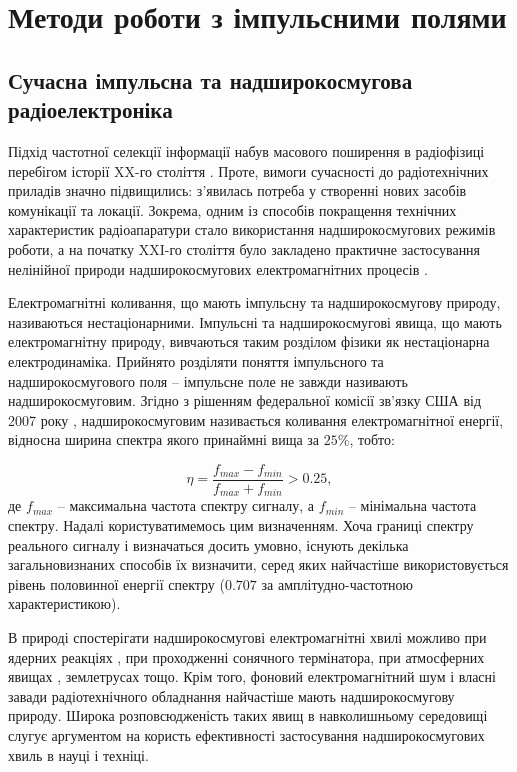 \chapter{Методи роботи з імпульсними полями}
\label{ch:review}

\section{Сучасна імпульсна та надширокосмугова радіоелектроніка}

Підхід частотної селекції інформації набув масового поширення в радіофізиці
перебігом історії XX-го століття \cite{imp:Nosich2001}. Проте, вимоги 
сучасності до радіотехнічних приладів значно підвищились: з'явилась потреба 
у створенні нових засобів комунікації та локації. Зокрема, одним із 
способів покращення технічних характеристик радіоапаратури стало 
використання надширокосмугових режимів роботи, а на початку XXI-го 
століття було закладено практичне застосування нелінійної природи 
надширокосмугових електромагнітних процесів \cite{imp:Chernogor2008}.

Електромагнітні коливання, що мають імпульсну та надширокосмугову природу, 
називаються нестаціонарними. Імпульсні та надширокосмугові явища, 
що мають електромагнітну природу, вивчаються таким розділом фізики як 
нестаціонарна електродинаміка. Прийнято розділяти поняття імпульсного та
надширокосмугового поля -- імпульсне поле не завжди називають 
надширокосмуговим. Згідно з рішенням федеральної комісії зв'язку США від 2007 
року \cite{imp:RadarStandard2007}, надширокосмуговим називається коливання 
електромагнітної енергії, відносна ширина спектра якого принаймні вища за 
$ 25\% $, тобто:

\begin{equation} \label{eq:spectum_width}
\eta = \frac{f_{max} - f_{min}}{f_{max} + f_{min}} > 0.25,
\end{equation}
%
де $ f_{max} $ -- максимальна частота спектру сигналу, а $ f_{min} $ -- 
мінімальна частота спектру. Надалі користуватимемось цим визначенням. 
Хоча границі спектру реального сигналу і 
визначаться досить умовно, існують декілька загальновизнаних способів їх 
визначити, серед яких найчастіше використовується рівень половинної енергії 
спектру ($ 0.707 $ за амплітудно-частотною характеристикою).

В природі спостерігати надширокосмугові електромагнітні хвилі можливо при 
ядерних реакціях \cite{imp:Baum2007}, при проходженні сонячного термінатора, 
при атмосферних явищах \cite{imp:Uman2006}, землетрусах 
\cite{imp:Hayakawa2008} тощо. Крім того, фоновий електромагнітний шум і 
власні завади радіотехнічного обладнання найчастіше мають 
надширокосмугову природу. Широка розповсюдженість таких явищ в 
навколишньому середовищі слугує аргументом на користь ефективності 
застосування надширокосмугових хвиль в науці і техніці.

